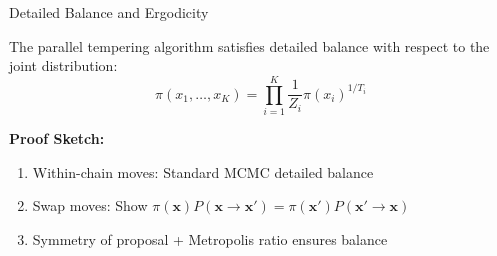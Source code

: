 \documentclass[aspectratio=169]{beamer}
\begin{document}

\begin{frame}{Detailed Balance and Ergodicity}
	\begin{proposition}
		The parallel tempering algorithm satisfies detailed balance with respect to the joint distribution:
		$$\pi(x_1, \ldots, x_K) = \prod_{i=1}^K \frac{1}{Z_i} \pi(x_i)^{1/T_i}$$
	\end{proposition}

	\textbf{Proof Sketch:}
	\begin{enumerate}
		\item Within-chain moves: Standard MCMC detailed balance
		\item Swap moves: Show $\pi(\mathbf{x}) P(\mathbf{x} \to \mathbf{x}') = \pi(\mathbf{x}') P(\mathbf{x}' \to \mathbf{x})$
		\item Symmetry of proposal + Metropolis ratio ensures balance
	\end{enumerate}

\end{frame}


\end{document}
